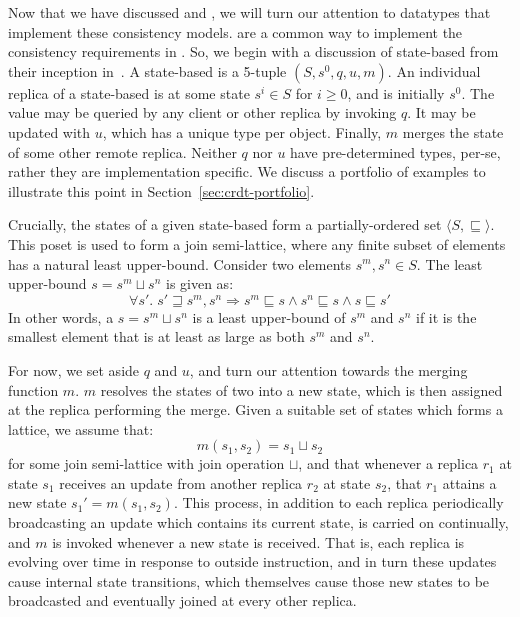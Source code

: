 Now that we have discussed \EC and \SEC, we will turn our attention to datatypes
that implement these consistency models.  \CRDTs are a common way to implement
the consistency requirements in \SEC. So, we begin with a discussion of
state-based \CRDTs from their inception in~\citep{shapiro11}. A state-based
\CRDT is a 5-tuple $(S, s^0, q, u, m)$. An individual replica of a state-based
\CRDT is at some state $s^i \in S$ for $i \ge 0$, and is initially $s^0$. The
value may be queried by any client or other replica by invoking $q$. It may be
updated with $u$, which has a unique type per \CRDT object. Finally, $m$ merges
the state of some other remote replica.  Neither $q$ nor $u$ have pre-determined
types, per-se, rather they are implementation specific. We discuss a portfolio
of examples to illustrate this point in Section~\ref{sec:crdt-portfolio}.

Crucially, the states of a given state-based \CRDT form a partially-ordered set
$\langle S, \sqsubseteq \rangle$. This poset is used to form a join
semi-lattice, where any finite subset of elements has a natural least
upper-bound. Consider two elements $s^m, s^n \in S$. The least upper-bound
$s = s^m \sqcup s^n$ is given as:
\[
  \forall s'.\; s' \sqsupseteq s^m, s^n \Rightarrow
    s^m \sqsubseteq s \land
    s^n \sqsubseteq s \land
    s \sqsubseteq s'
\]
In other words, a $s = s^m \sqcup s^n$ is a least upper-bound of $s^m$ and $s^n$
if it is the smallest element that is at least as large as both $s^m$ and $s^n$.

For now, we set aside $q$ and $u$, and turn our attention towards the merging
function $m$. $m$ resolves the states of two \CRDTs into a new state, which is
then assigned at the replica performing the merge. Given a suitable set of
states which forms a lattice, we assume that:
\[
  m(s_1, s_2) = s_1 \sqcup s_2
\]
for some join semi-lattice with join operation $\sqcup$, and that whenever a
\CRDT replica $r_1$ at state $s_1$ receives an update from another replica
$r_2$ at state $s_2$, that $r_1$ attains a new state $s_1' = m(s_1, s_2)$.
This process, in addition to each replica periodically broadcasting an update
which contains its current state, is carried on continually, and $m$ is
invoked whenever a new state is received. That is, each replica is evolving
over time in response to outside instruction, and in turn these updates cause
internal state transitions, which themselves cause those new states to be
broadcasted and eventually joined at every other replica.

